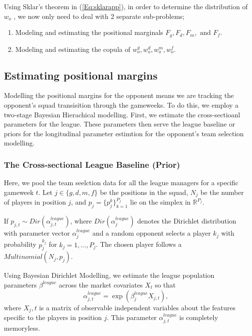 \documentclass[12pt,oneside,a4paper]{book}
\theoremstyle{definition}
\theoremstyle{remark}
\begin{document}
			Using Sklar's theorem in (\ref{Eq:sklarapp}), in order to determine the distribution of $w_o$ , we now only need to deal with 2 separate sub-problems;
				\begin{enumerate}
					\item[(i).] Modeling and estimating the positional marginals $F_g, F_d, F_m, \text{ and }F_f.$
					\item[(ii).] Modeling and estimating the copula of $w_o^g,w_o^d,w_o^m,w_o^f$.
				\end{enumerate}

			\subsection{Estimating positional margins}
				Modelling the positional margins for the opponent means we are tracking the opponent's squad transisition through the gameweeks. To do this, we employ a two-stage Bayesian Hierachical modelling.
				First, we estimate the cross-sectioanl parameters for the league. These parameters then serve the league baseline or priors for the longitudinal parameter estimtion for the opponent's team selection modelling.

				\subsubsection{The Cross-sectional League Baseline (Prior)}
				Here, we pool the team seelction data for all the league managers for a specific gameweek $t$. Let $j \in \{g,d,m,f\}$ be the positions in the squad, $N_j$ be the number of players in position $j$, and $p_j = \{p_j^k\}_{k=1}^{P_j}$ lie on the simplex in $\mathbb{R}^{P_j}$.

				If $p_{j,t} \sim Dir(\alpha^{league}_{j,t})$, where $Dir (\alpha^{league}_j)$ denotes the Dirichlet distribution with parameter vector $\alpha^{league}_j$ and a random opponent selects a player $k_j$ with probability $p_j^{k_j}$ for $k_j = 1, ..., P_j$. The chosen player follows a $Multinomial(N_j, p_j)$.

				Using Bayesian Dirichlet Modelling, we estimate the league population parameters $\beta^{league}$ across the market covariates  $X_t$ so that
				\begin{equation}\label{eq:alpha_league}
					\alpha_{j,t}^{league} = \exp\left(\beta_{j}^{league} X_{j,t} \right),
				\end{equation}
				where $X_j,t$ is a matrix of observable independent variables about the features specific to the players in position $j$.
				This parameter $\alpha_{j,t}^{league}$ is completely memoryless.
\end{document}
